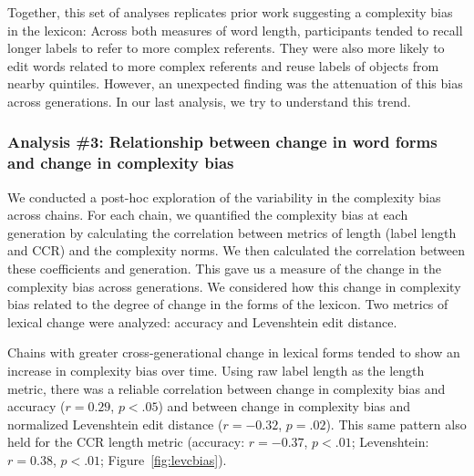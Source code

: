 Together, this set of analyses replicates prior work suggesting a complexity bias in the lexicon: Across both measures of word length, participants tended to recall longer labels to refer to more complex referents. They were also more likely to edit words related to more complex referents and reuse labels of objects from nearby quintiles. However, an unexpected finding was the attenuation of this bias across generations. In our last analysis, we try to understand this trend.


   


\subsubsection{Analysis \#3: Relationship between change in word forms and change in complexity bias} 


We  conducted a post-hoc exploration of the variability in the complexity bias across chains. For each chain, we quantified the complexity bias at each generation by calculating the correlation between metrics of length (label length and CCR) and the complexity norms. We then calculated the correlation between these coefficients and generation. This gave us a measure of the change in the complexity bias across generations. We considered how this change in complexity bias related to the degree of change in the forms of the lexicon. Two metrics of lexical change were analyzed: accuracy and Levenshtein edit distance. 

Chains with greater cross-generational change in lexical forms tended to show an increase in complexity bias over time. Using raw label length as the length metric, there was a reliable correlation between change in complexity bias and accuracy ($r=0.29$, $p <.05$) and between  change in complexity bias  and normalized Levenshtein edit distance ($r=-0.32$, $p =.02$). This same pattern also held for the CCR length metric (accuracy: $r=-0.37$, $p <.01$; Levenshtein: $r=0.38$, $p <.01$; Figure\ \ref{fig:levcbias}).


